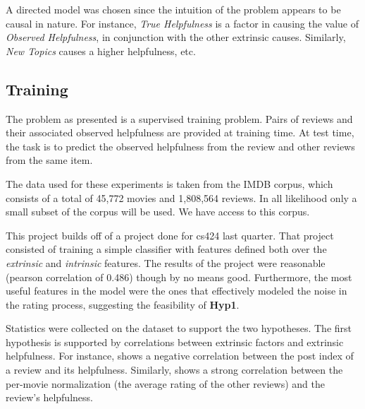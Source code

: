 \documentclass[letter,12pt]{article}
\begin{document}
A directed model was chosen since the intuition of the problem appears to
	be causal in nature.
For instance, {\em True Helpfulness} is a factor in causing the value of
	{\em Observed Helpfulness}, in conjunction with the other extrinsic
	causes.
Similarly, {\em New Topics} causes a higher helpfulness, etc.

\subsection{Training}
The problem as presented is a supervised training problem.
Pairs of reviews and their associated observed helpfulness are provided at
	training time.
At test time, the task is to predict the observed helpfulness from the review
	and other reviews from the same item.

The data used for these experiments is taken from the IMDB corpus, which
	consists of a total of 45,772 movies and 1,808,564 reviews.
In all likelihood only a small subset of the corpus will be used.
We have access to this corpus.


This project builds off of a project done for cs424 last quarter.
That project consisted of training a simple classifier with features
	defined both over the {\em extrinsic} and {\em intrinsic} features.
The results of the project were reasonable (pearson correlation of 0.486)
	though by no means good.
Furthermore, the most useful features in the model were the ones that
	effectively modeled the noise in the rating process, suggesting the
	feasibility of {\bf Hyp1}.

Statistics were collected on the dataset to support the two hypotheses.
The first hypothesis is supported by correlations between extrinsic
	factors and extrinsic helpfulness.
For instance,  shows a negative correlation between the
	post index of a review and its helpfulness.
Similarly,  shows a strong correlation between the
	per-movie normalization (the average rating of the other reviews)
	and the review's helpfulness.

\end{document}
